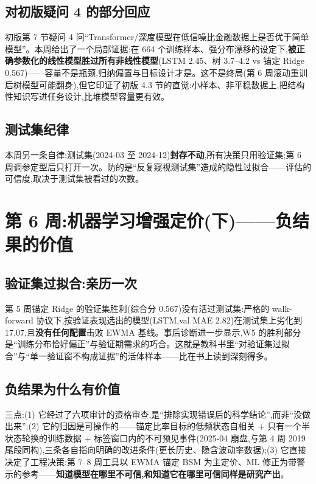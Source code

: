 \documentclass[11pt]{ctexart}
\begin{document}
\subsection{对初版疑问 4 的部分回应}
初版第 7 节疑问 4 问``Transformer/深度模型在低信噪比金融数据上是否优于简单模型''。本周给出了一个局部证据:在 664 个训练样本、强分布漂移的设定下,\textbf{被正确参数化的线性模型胜过所有非线性模型}(LSTM 2.45、树 3.7--4.2 vs 锚定 Ridge 0.567)——容量不是瓶颈,归纳偏置与目标设计才是。这不是终局(第 6 周滚动重训后树模型可能翻身),但它印证了初版 4.3 节的直觉:小样本、非平稳数据上,把结构性知识写进任务设计,比堆模型容量更有效。

\subsection{测试集纪律}
本周另一条自律:测试集(2024-03 至 2024-12)\textbf{封存不动},所有决策只用验证集;第 6 周调参定型后只打开一次。防的是``反复窥视测试集''造成的隐性过拟合——评估的可信度,取决于测试集被看过的次数。

\section{第 6 周:机器学习增强定价(下)——负结果的价值}

\subsection{验证集过拟合:亲历一次}
第 5 周锚定 Ridge 的验证集胜利(综合分 0.567)没有活过测试集:严格的 walk-forward 协议下,按验证表现选出的模型(LSTM,val MAE 2.82)在测试集上劣化到 17.07,且\textbf{没有任何配置}击败 EWMA 基线。事后诊断进一步显示,W5 的胜利部分是``训练分布恰好偏正''与验证期需求的巧合。这就是教科书里``对验证集过拟合''与``单一验证窗不构成证据''的活体样本——比在书上读到深刻得多。

\subsection{负结果为什么有价值}
三点:(1) 它经过了六项审计的资格审查,是``排除实现错误后的科学结论'',而非``没做出来'';(2) 它的归因是可操作的——锚定比率目标的低频状态自相关 + 只有一个半状态轮换的训练数据 + 标签窗口内的不可预见事件(2025-04 崩盘,与第 4 周 2019 尾段同构),三条各自指向明确的改进条件(更长历史、隐含波动率数据);(3) 它直接决定了工程决策:第 7--8 周工具以 EWMA 锚定 BSM 为主定价、ML 修正为带警示的参考——\textbf{知道模型在哪里不可信,和知道它在哪里可信同样是研究产出}。
\end{document}
